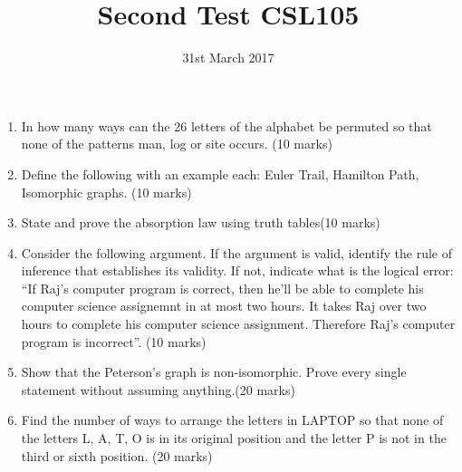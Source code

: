 \documentclass{article}
\title{Second Test CSL105}
\date{31st March 2017}
\begin{document}
\maketitle

\begin{enumerate}
    \item In how many ways can the 26 letters of the alphabet be permuted so that none of the patterns man, log or site occurs.     (10 marks)
    \item Define the following with an example each: Euler Trail, Hamilton Path, Isomorphic graphs.    (10 marks)
    \item State and prove the absorption law using truth tables(10 marks)
    \item Consider the following argument. If the argument is valid, identify the rule of inference that establishes its validity. If not, indicate what is the logical error: ``If Raj's computer program is correct, then he'll be able to complete his computer science assignemnt in at most two hours. It takes Raj over two hours to complete his computer science assignment. Therefore Raj's computer program is incorrect''. (10 marks)
    \item Show that the Peterson's graph is non-isomorphic. Prove every single statement without assuming anything.(20 marks)
    \item Find the number of ways to arrange the letters in LAPTOP so that none of the letters L, A, T, O is in its original position and the letter P is not in the third or sixth position. (20 marks)


\end{enumerate}
\end{document}
